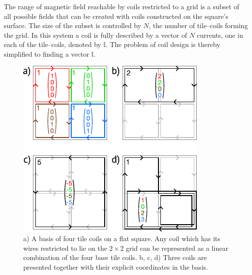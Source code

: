The range of magnetic field reachable by coils restricted to a grid is a subset of all possible fields that can be created with coils constructed on the square's surface. The size of the subset is controlled by $N$, the number of tile--coils forming the grid.
In this system a coil is fully described by a vector of $N$ currents, one in each of the tile--coils, denoted by $\mathbb{I}$. The problem of coil design is thereby simplified to finding a vector $\mathbb{I}$.

\begin{figure}
  \centering
  \includegraphics[width=0.8\linewidth]{gfx/coils/tile_basis.pdf}
  \caption{a) A basis of four tile coils on a flat square. Any coil which has its wires restricted to lie on the $2 \times 2$ grid can be represented as a linear combination of the four base tile coils. b, c, d) Three coils are presented together with their explicit coordinates in the basis.}
  \label{fig:coils_tile_basis}
\end{figure}

